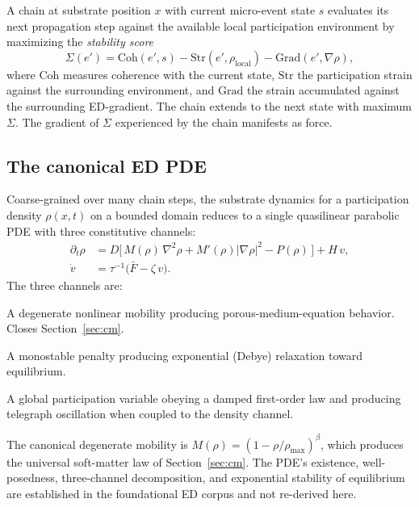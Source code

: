 \documentclass[11pt,a4paper]{article}
\begin{document}
A chain at substrate position $x$ with current micro-event state $s$ evaluates its next propagation step against the available local participation environment by maximizing the \emph{stability score}
\begin{equation}
\Sigma(e') = \mathrm{Coh}(e', s) - \mathrm{Str}(e', \rho_\mathrm{local}) - \mathrm{Grad}(e', \nabla \rho),
\label{eq:Sigma}
\end{equation}
where $\mathrm{Coh}$ measures coherence with the current state, $\mathrm{Str}$ the participation strain against the surrounding environment, and $\mathrm{Grad}$ the strain accumulated against the surrounding ED-gradient. The chain extends to the next state with maximum $\Sigma$. The gradient of $\Sigma$ experienced by the chain manifests as force.

\subsection{The canonical ED PDE}

Coarse-grained over many chain steps, the substrate dynamics for a participation density $\rho(x,t)$ on a bounded domain reduces to a single quasilinear parabolic PDE with three constitutive channels:
\begin{align}
\partial_t \rho &= D \bigl[\, M(\rho) \, \nabla^2 \rho + M'(\rho) |\nabla\rho|^2 - P(\rho) \,\bigr] + H \, v, \label{eq:PDE1}\\
\dot{v} &= \tau^{-1}\bigl(\bar F - \zeta\, v\bigr). \label{eq:PDE2}
\end{align}
The three channels are:
\begin{description}[leftmargin=1em, itemsep=2pt]
\item[Mobility ($M$).] A degenerate nonlinear mobility producing porous-medium-equation behavior. Closes Section~\ref{sec:cm}.
\item[Penalty ($P$).] A monostable penalty producing exponential (Debye) relaxation toward equilibrium.
\item[Participation ($v$).] A global participation variable obeying a damped first-order law and producing telegraph oscillation when coupled to the density channel.
\end{description}
The canonical degenerate mobility is $M(\rho) = (1 - \rho/\rho_\mathrm{max})^\beta$, which produces the universal soft-matter law of Section~\ref{sec:cm}. The PDE's existence, well-posedness, three-channel decomposition, and exponential stability of equilibrium are established in the foundational ED corpus and not re-derived here.
\end{document}
